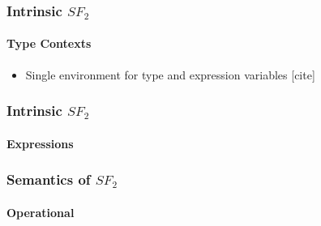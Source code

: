 \documentclass[dvipsnames,aspectratio=169,pdftex]{beamer}
\begin{document}
\begin{frame}
  \frametitle{Intrinsic $SF_2$}
  \framesubtitle{Type Contexts}
  \TFTVEnv
  \TFinn
  \begin{itemize}
    \item Single environment for type and expression variables [cite]
  \end{itemize}
\end{frame}

\begin{frame}
  \frametitle{Intrinsic $SF_2$}
  \framesubtitle{Expressions}
  \TFExprExcerpt
\end{frame}

\begin{frame}
  \frametitle{Semantics of $SF_2$}
  \framesubtitle{Operational}
  \SmallStepSingleReductionExcerpt
  \SmallStepSemanticsExcerpt
\end{frame}



\end{document}
